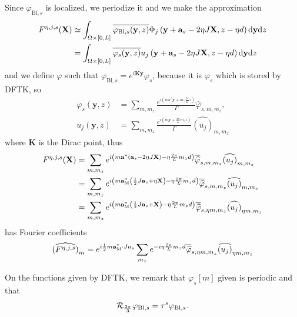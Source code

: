 \documentclass[11pt,a4paper,reqno,french,tikz]{amsart}
\def\d{{\rm d}}
\newcommand{\pa}[1]{\left( #1 \right)} %
\newcommand\vp{\varphi} %
\newcommand{\f}[2]{\frac{#1}{#2}} %
\newcommand{\ind}[1]{_{\textup{#1}}} %
\def\bX{{\mathbf X}}
\def\ba{{\mathbf a}}
\def\by{{\mathbf y}}
\def\bK{{\mathbf K}}
\begin{document}
Since $\vp_{\text{Bl},s}$ is localized, we periodize it and we make the approximation
\begin{align*}
	F^{\eta,j,s}(\bX) &\simeq \int_{\Omega \times [0,L]} \overline{\vp_{\text{Bl},s}(\by,z)} \Phi_j\pa{\by +\ba_s -2\eta J \bX,z-\eta d} \d \by \d z \\
&=\int_{\Omega \times [0,L]} \overline{\vp_{s}(\by,z)} u_j\pa{\by +\ba_s -2\eta J \bX,z-\eta d} \d \by \d z
\end{align*}
and we define $\vp$ such that $\vp_{\text{Bl},s} = e^{i \bK \by} \vp_s$, because it is $\widehat{\vp_s}$ which is stored by DFTK, so
\begin{align*}
	\vp_{s}(\by,z) &= \sum_{m, m_z} \f{e^{i\pa{m a^* \by + m_z \f{2\pi}{L}  z}}}{\Gamma} \widehat{\vp}_{s,m,m_z}, \\
	u_j(\by,z) &= \sum_{m, m_z} \f{e^{i\pa{m \by + \f{2\pi}{L} m_z z}}}{\Gamma} \widehat{\pa{u_j}}_{m,m_z}
\end{align*}
where $\bK$ is the Dirac point, thus
\begin{align*}
F^{\eta,j,s}(\bX) &=  \sum_{m, m_z} e^{i\pa{m \ba^* \pa{\ba_s - 2\eta J \bX} - \eta \f{2\pi}{L} m_z d}} \overline{\widehat{\vp}}_{s,m,m_z} \widehat{\pa{u_j}}_{m,m_z} \\
		  &=  \sum_{m, m_z} e^{i\pa{m \ba\ind{M}^* \pa{\f{1}{2} J \ba_s + \eta \bX} - \eta \f{2\pi}{L} m_z d}} \overline{\widehat{\vp}}_{s,m,m_z} \widehat{\pa{u_j}}_{m,m_z} \\
		  &=  \sum_{m, m_z} e^{i\pa{m \ba\ind{M}^* \pa{\f{1}{2} J \ba_s + \bX} - \eta \f{2\pi}{L} m_z d}} \overline{\widehat{\vp}}_{s,\eta m,m_z} \widehat{\pa{u_j}}_{\eta m,m_z}
\end{align*}
has Fourier coefficients
\begin{align*}
\widehat{\pa{F^{\eta,j,s}}}_{m} = e^{i \f{1}{2} m \ba\ind{M}^* \cdot J a_s} \sum_{m_z} e^{-i \eta \f{2\pi}{L} m_z d} \overline{\widehat{\vp}}_{s,\eta m,m_z} \widehat{\pa{u_j}}_{\eta m,m_z}
\end{align*}

On the functions given by DFTK, we remark that $\vp_s[m]$ given is periodic and that 
\begin{align*}
\cR_{\f{2\pi}{3}} \vp_{\text{Bl},s} = \tau^s \vp_{\text{Bl},s}.
\end{align*}
\end{document}
